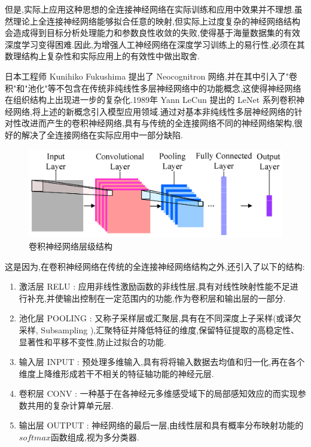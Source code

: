 但是,实际上应用这种思想的全连接神经网络在实际训练和应用中效果并不理想.虽然理论上全连接神经网络能够拟合任意的映射,但实际上过度复杂的神经网络结构会造成得到目标分析处理能力和参数良性收敛的失败,使得基于海量数据集的有效深度学习变得困难.因此,为增强人工神经网络在深度学习训练上的易行性,必须在其数理结构上复杂性和实际应用上的有效性中做出取舍.

日本工程师 Kunihiko Fukushima 提出了 Neocognitron 网络,并在其中引入了"卷积"和"池化"等不包含在传统非纯线性多层神经网络中的功能概念\cite{neocognitron},这使得神经网络在组织结构上出现进一步的复杂化.1989年 Yann LeCun 提出的 LeNet 系列卷积神经网络\cite{LeNet},将上述的新概念引入模型应用领域.通过对基本非纯线性多层神经网络的针对性改进而产生的卷积神经网络,具有与传统的全连接网络不同的神经网络架构,很好的解决了全连接网络在实际应用中一部分缺陷.

\begin{figure}
\centering
\includegraphics[scale=1]{Figures/CNN3.png}
\caption{卷积神经网络层级结构}
\end{figure}

这是因为,在卷积神经网络在传统的全连接神经网络结构之外,还引入了以下的结构\cite{cnnjieshao}:
\begin{enumerate}
	\item 激活层 RELU : 应用非线性激励函数的非线性层,具有对线性映射性能不足进行补充,并使输出控制在一定范围内的功能,作为卷积层和输出层的一部分.
	\item 池化层 POOLING : 又称子采样层或汇聚层,具有在不同深度上子采样(或译欠采样, Subsampling ),汇聚特征并降低特征的维度,保留特征提取的高稳定性、显著性和平移不变性\cite{pingyibubianxing},防止过拟合的功能.
	\item 输入层 INPUT : 预处理多维输入,具有将将输入数据去均值和归一化,再在各个维度上降维形成若干不相关的特征轴功能的神经元层.
	\item 卷积层 CONV : 一种基于在各神经元多维感受域下的局部感知效应的而实现参数共用的复杂计算单元层.
	\item 输出层 OUTPUT : 神经网络的最后一层,由线性层和具有概率分布映射功能的$softmax$函数组成,视为多分类器.
\end{enumerate}


